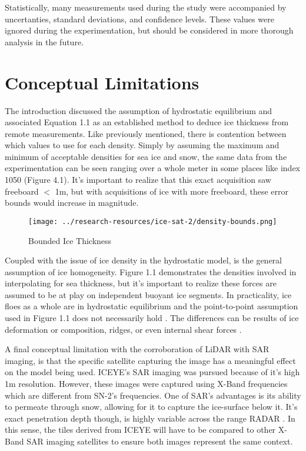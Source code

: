 Statistically, many measurements used during the study were accompanied by uncertanties, standard deviations, and confidence levels. These values were ignored during the experimentation, but should be considered in more thorough analysis in the future. 

\section{Conceptual Limitations}
The introduction discussed the assumption of hydrostatic equilibrium and associated Equation 1.1 as an established method to deduce ice thickness from remote measurements. Like previously mentioned, there is contention between which values to use for each density. Simply by assuming the maximum and minimum of acceptable densities for sea ice and snow, the same data from the experimentation can be seen ranging over a whole meter in some places like index 1050 (Figure 4.1). It's important to realize that this exact acquisition saw freeboard $<$ 1m, but with acquisitions of ice with more freeboard, these error bounds would increase in magnitude.

\begin{figure}[h]
	\centering
	\texttt{[image: ../research-resources/ice-sat-2/density-bounds.png]}
	\caption[Effect of Density Estimations on Ice Thickness Interpolation]{Bounded Ice Thickness}
	\label{fig:density-bounds}
\end{figure}

Coupled with the issue of ice density in the hydrostatic model, is the general assumption of ice homogeneity. Figure 1.1 demonstrates the densities involved in interpolating for sea thickness, but it's important to realize these forces are assumed to be at play on independent buoyant ice segments. In practicality, ice floes as a whole are in hydrostatic equilibrium and the point-to-point assumption used in Figure 1.1 does not necessarily hold \cite{Forsström_Gerland_Pedersen_2011}. The differences can be results of ice deformation or composition, ridges, or even  internal shear forces \cite{Hutchings_Heil_Lecomte_Stevens_Steer_Lieser_2015,sea-ice-properties}. 

A final conceptual limitation with the corroboration of LiDAR with SAR imaging, is that the specific satellite capturing the image has a meaningful effect on the model being used. ICEYE's SAR imaging was pursued because of it's high 1m resolution. However, these images were captured using X-Band frequencies which are different from SN-2's \cite{iceye-products,Sentinel-2-Availability} frequencies. One of SAR's advantages is its ability to permeate through snow, allowing for it to capture the ice-surface below it. It's exact penetration depth though, is highly variable across the range RADAR \cite{remotesensingkinematics}. In this sense, the tiles derived from ICEYE will have to be compared to other X-Band SAR imaging satellites to ensure both images represent the same context.


